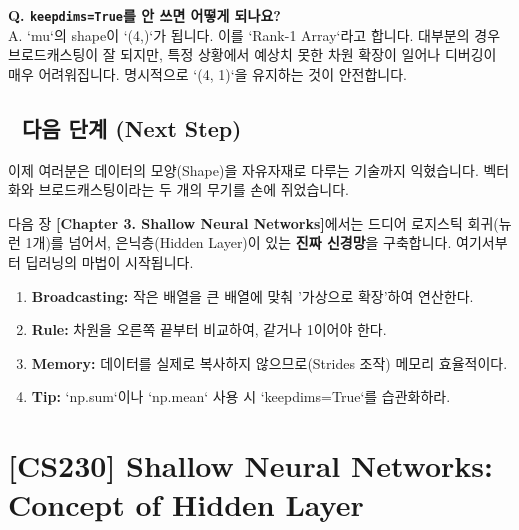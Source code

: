 \documentclass[11pt,a4paper]{book}
\theoremstyle{definition}
\begin{document}
\textbf{Q. \texttt{keepdims=True}를 안 쓰면 어떻게 되나요?} \\
A. `mu`의 shape이 `(4,)`가 됩니다. 이를 `Rank-1 Array`라고 합니다. 대부분의 경우 브로드캐스팅이 잘 되지만, 특정 상황에서 예상치 못한 차원 확장이 일어나 디버깅이 매우 어려워집니다. 명시적으로 `(4, 1)`을 유지하는 것이 안전합니다.

\section*{🔗 다음 단계 (Next Step)}
이제 여러분은 데이터의 모양(Shape)을 자유자재로 다루는 기술까지 익혔습니다. 벡터화와 브로드캐스팅이라는 두 개의 무기를 손에 쥐었습니다.

다음 장 \textbf{[Chapter 3. Shallow Neural Networks]}에서는 드디어 로지스틱 회귀(뉴런 1개)를 넘어서, 은닉층(Hidden Layer)이 있는 \textbf{진짜 신경망}을 구축합니다. 여기서부터 딥러닝의 마법이 시작됩니다.

\vspace{0.5cm}

\begin{summarybox}[title={단원 요약 (Cheat Sheet)}]
\begin{enumerate}
    \item \textbf{Broadcasting:} 작은 배열을 큰 배열에 맞춰 '가상으로 확장'하여 연산한다.
    \item \textbf{Rule:} 차원을 오른쪽 끝부터 비교하여, 같거나 1이어야 한다.
    \item \textbf{Memory:} 데이터를 실제로 복사하지 않으므로(Strides 조작) 메모리 효율적이다.
    \item \textbf{Tip:} `np.sum`이나 `np.mean` 사용 시 `keepdims=True`를 습관화하라.
\end{enumerate}
\end{summarybox}


\chapter{[CS230] Shallow Neural Networks: \\ Concept of Hidden Layer}
\label{ch:lecture6}

\end{document}
